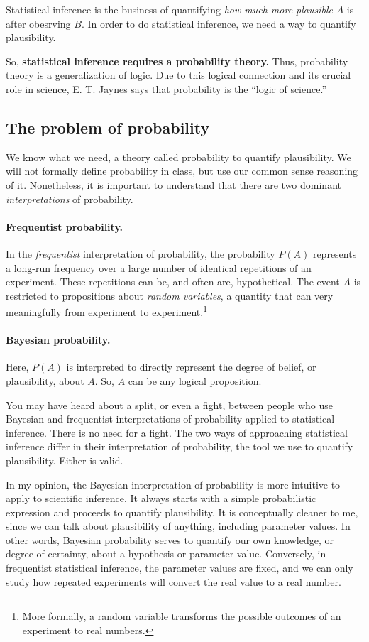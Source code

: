 Statistical inference is the business of quantifying \textit{how
  much more plausible} $A$ is after obesrving $B$. In order to do statistical inference, we need a way to quantify plausibility.

So, \textbf{statistical inference requires a probability theory.}
Thus, probability theory is a generalization of logic.  Due to this
logical connection and its crucial role in science, E. T. Jaynes says
that probability is the ``logic of science.''


\subsection{The problem of probability}
We know what we need, a theory called probability to quantify
plausibility.  We will not formally define probability in class, but
use our common sense reasoning of it.  Nonetheless, it is important to
understand that there are two dominant \textit{interpretations} of probability.

\paragraph{Frequentist probability.}  In the \textit{frequentist}
interpretation of probability, the probability $P(A)$ represents a
long-run frequency over a large number of identical repetitions of an
experiment.  These repetitions can be, and often are, hypothetical.
The event $A$ is restricted to propositions about \textit{random
  variables}, a quantity that can very meaningfully from experiment to
experiment.\footnote{More formally, a random variable transforms the
  possible outcomes of an experiment to real numbers.}

\paragraph{Bayesian probability.} Here, $P(A)$ is interpreted to directly represent the
degree of belief, or plausibility, about $A$.  So, $A$ can be any
logical proposition.

You may have heard about a split, or even a fight, between people who
use Bayesian and frequentist interpretations of probability applied to statistical inference.  There is no need
for a fight.  The two ways of approaching statistical inference differ
in their interpretation of probability, the tool we use to quantify
plausibility.  Either is valid.

In my opinion, the Bayesian interpretation of probability is more
intuitive to apply to scientific inference.  It always starts with a
simple probabilistic expression and proceeds to quantify plausibility.
It is conceptually cleaner to me, since we can talk about plausibility
of anything, including parameter values.  In other words, Bayesian
probability serves to quantify our own knowledge, or degree of
certainty, about a hypothesis or parameter value.  Conversely, in
frequentist statistical inference, the parameter values are fixed, and
we can only study how repeated experiments will convert the real value
to a real number.

